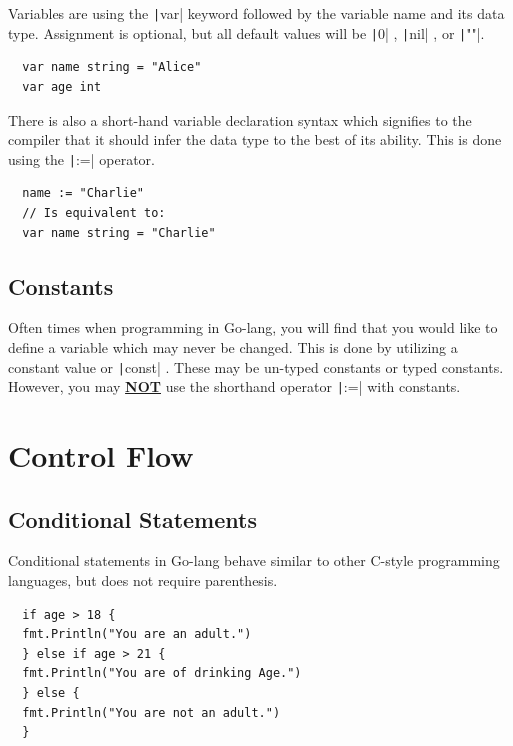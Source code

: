 \documentclass[letterpaper,12pt]{article}
\begin{document}
Variables are using the \texttt|var| keyword followed by the variable name and its data type. Assignment is optional, but all default values will be \texttt|0| , \texttt|nil| , or \texttt|""|. 
\begin{verbatim}
  var name string = "Alice" 
  var age int
\end{verbatim}
There is also a short-hand variable declaration syntax which signifies to the compiler that it should infer the data type to the best of its ability. This is done using the \texttt|:=|  operator.
\begin{verbatim}
  name := "Charlie"  
  // Is equivalent to:
  var name string = "Charlie"
\end{verbatim}
\subsection{Constants}
Often times when programming in Go-lang, you will find that you would like to define a variable which may never be changed. This is done by utilizing a constant value or \texttt|const| . These may be un-typed constants or typed constants. However, you may \textbf{\underline{NOT}} use the shorthand operator \texttt|:=|  with constants.

\section{Control Flow}
\subsection{Conditional Statements}
Conditional statements in Go-lang behave similar to other C-style programming languages, but does not require parenthesis.
\begin{verbatim}
  if age > 18 {
  fmt.Println("You are an adult.")
  } else if age > 21 {
  fmt.Println("You are of drinking Age.")
  } else {
  fmt.Println("You are not an adult.")
  }
\end{verbatim}
\end{document}
